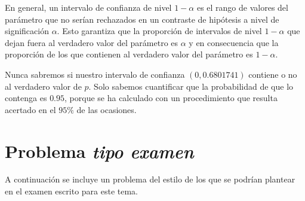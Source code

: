 \documentclass[
  notoc,
  nobib,
  degree=inf]{mnye}
\begin{document}
En general, un intervalo de confianza de nivel \(1-\alpha\) es el rango de valores del parámetro que no serían rechazados en un contraste de hipótesis a nivel de significación \(\alpha\). Esto garantiza que la proporción de intervalos de nivel \(1-\alpha\) que dejan fuera al verdadero valor del parámetro es \(\alpha\) y en consecuencia que la proporción de los que contienen al verdadero valor del parámetro es \(1-\alpha\).

Nunca sabremos si nuestro intervalo de confianza \((0, 0.6801741)\) contiene o no al verdadero valor de \(p\). Solo sabemos cuantificar que la probabilidad de que lo contenga es \(0.95\), porque se ha calculado con un procedimiento que resulta acertado en el \(95\%\) de las ocasiones.

\nocite{Milton2003}
\nocite{Montgomery2010}

\makeatletter
\renewcommand{\mybibnote@contents}{%
Para ampliar conocimientos de este tema puedes consultar los Capítulos 6, 7, 8 y 9   de  \cite{Milton2003} y los Capítulos 6, 7, 8 y 9 de \cite{Montgomery2010}. 
}
\makeatother

\hypertarget{problema-tipo-examen}{%
\section*{\texorpdfstring{Problema \emph{tipo examen}}{Problema tipo examen}}\label{problema-tipo-examen}}

A continuación se incluye un problema del estilo de los que se podrían plantear en el examen escrito para este tema.
\end{document}
